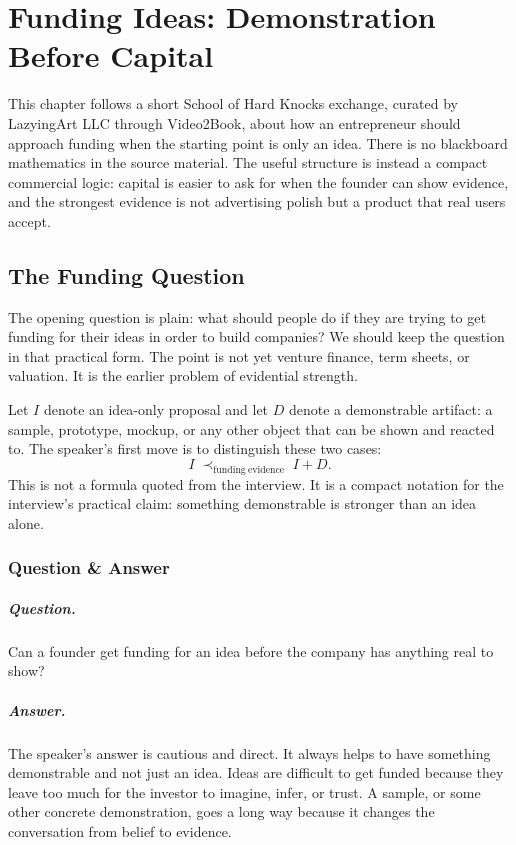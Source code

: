 \chapter{Funding Ideas: Demonstration Before Capital}

This chapter follows a short School of Hard Knocks exchange, curated by LazyingArt LLC through Video2Book, about how an entrepreneur should approach funding when the starting point is only an idea. There is no blackboard mathematics in the source material. The useful structure is instead a compact commercial logic: capital is easier to ask for when the founder can show evidence, and the strongest evidence is not advertising polish but a product that real users accept.

\section{The Funding Question}

The opening question is plain: what should people do if they are trying to get funding for their ideas in order to build companies? We should keep the question in that practical form. The point is not yet venture finance, term sheets, or valuation. It is the earlier problem of evidential strength.

Let \(I\) denote an idea-only proposal and let \(D\) denote a demonstrable artifact: a sample, prototype, mockup, or any other object that can be shown and reacted to. The speaker's first move is to distinguish these two cases:
\begin{equation}
I \;\prec_{\mathrm{funding\ evidence}}\; I + D .
\end{equation}
This is not a formula quoted from the interview. It is a compact notation for the interview's practical claim: something demonstrable is stronger than an idea alone.

\subsection{Question \& Answer}

\paragraph{Question.}
Can a founder get funding for an idea before the company has anything real to show?

\paragraph{Answer.}
The speaker's answer is cautious and direct. It always helps to have something demonstrable and not just an idea. Ideas are difficult to get funded because they leave too much for the investor to imagine, infer, or trust. A sample, or some other concrete demonstration, goes a long way because it changes the conversation from belief to evidence.

